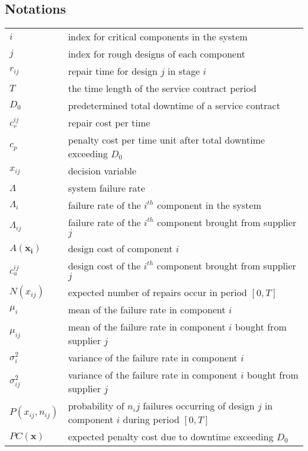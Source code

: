 \documentclass[preprint,12pt]{elsarticle}
\begin{document}
 \subsection{Notations}
   \begin{tabular}{l l}
$i$ & index for critical components in the system\\
$j$ & index for rough designs of each component\\
$r_{ij}$ & repair time for design $j$ in stage $i$\\
$T$ & the time length of the service contract period\\
$D_0$ & predetermined total downtime of a service contract\\
$c_r^{ij}$ & repair cost per time\\
$c_p$ & penalty cost per time unit after total downtime exceeding $D_0$ \\
$x_{ij}$ & decision variable\\
$\Lambda$    & system failure rate\\
$\Lambda_{i}$  & failure rate of the $i^{th}$ component in the system \\
$\Lambda_{ij}$ & failure rate of the $i^{th}$ component brought from supplier $j$ \\
$A(\boldsymbol{x_{i}})$  &  design cost of component $i$\\
$c^{ij}_{a}$ & design cost of the $i^{th}$ component brought from supplier $j$\\
$N(x_{ij})$ & expected number of repairs occur in period $[0, T]$\\
$\mu_{i}$ & mean of the failure rate in component $i$ \\
$\mu_{ij}$ & mean of the failure rate in component $i$ bought from supplier $j$ \\
$\sigma_{i}^{2}$ &  variance of the failure rate in component $i$ \\
$\sigma_{ij}^{2}$ & variance of the failure rate in component $i$ bought from supplier $j$ \\
$P(x_{ij},n_{ij})$  & probability of $n_ij$ failures occurring of design $j$ in component $i$ during period $[0, T]$ \\
$PC(\boldsymbol{x})$ & expected penalty cost due to downtime exceeding $D_{0}$ \\

	\end{tabular}
\end{document}
